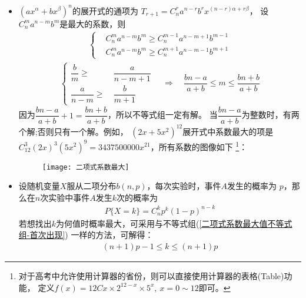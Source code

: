 \begin{itemize}[leftmargin=\inteval{\myitemleftmargin}pt,itemsep=
   \inteval{\myitemitempsep}pt,topsep=\inteval{\myitemtopsep}pt]
上面介绍的上台阶、汉诺塔和错排三个问题，如果试图直接寻找答案，无疑是相当困难的，而寻找递推关系则要简单得多。
\item $ \left(ax^{\alpha}+bx^{\beta} \right)^n $的展开式的通项为
$ T_{r+1}=C_n^ra^{n-r}b^rx^{(n-r)\alpha+r\beta} $，
设$ C_n^m a^{n-m}b^m $是最大的系数，则
\begin{align}\label{二项式系数最大值不等式组-首次出现}
    \left\{
    \begin{aligned}
        & C_n^m a^{n-m}b^m\geq C_n^{m-1} a^{n-m+1}b^{m-1} \\
        & C_n^m a^{n-m}b^m\geq C_n^{m+1} a^{n-m-1}b^{m+1}
    \end{aligned}
    \right.
\end{align} 
\begin{align*}
    \left\{
    \begin{aligned}
        \dfrac{b}{m}   \geq &\ \dfrac{a}{n-m+1} \\
        \dfrac{a}{n-m} \geq &\ \dfrac{b}{m+1}
    \end{aligned}
    \right. \quad \Rightarrow \quad 
    \dfrac{bn-a}{a+b} \leq m \leq \dfrac{bn+b}{a+b}
\end{align*} 
因为$ \dfrac{bn-a}{a+b}+1=\dfrac{bn+b}{a+b} $，所以不等式组一定有解。
当$ \dfrac{bn-a}{a+b} $为整数时，有两个解;否则只有一个解。例如，
$ (2x+5x^2)^{12} $展开式中系数最大的项是
$ C_{12}^{3}(2x)^3(5x^2)^9=3437500000x^{21} $，所有系数的图像如下
\footnote{对于高考中允许使用计算器的省份，则可以直接使用计算器的表格(Table)功能，
    定义$ f(x)= 12Cx\times 2^{12-x}\times 5^x,\ x=0\sim 12 $即可。}：
\begin{figure}[h]
    \centering
    \texttt{[image: 二项式系数最大]}
\end{figure} 

\item 设随机变量$ X $服从二项分布$ b(n,p) $，每次实验时，事件$ A $发生的概率为
$ p $，那么在$ n $次实验中事件$ A $发生$ k $次的概率为
\begin{align*}
    P\{X=k\}=C_n^kp^k(1-p)^{n-k}
\end{align*}
若想找出$ k $为何值时概率最大，可采用与不等式组(\ref{二项式系数最大值不等式组-首次出现})
一样的方法，可解得：
\begin{align*}
    (n+1)p-1\leq k \leq (n+1)p 
\end{align*}


\end{itemize}
